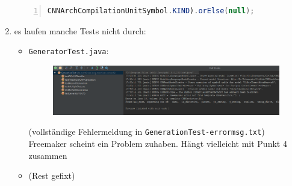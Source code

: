 \documentclass[11pt]{article}
\begin{document}
\begin{enumerate}
\begin{lstlisting}[language=java, numbers=left, basicstyle=\scriptsize]
CNNArchCompilationUnitSymbol.KIND).orElse(null);
			\end{lstlisting}
		\item es laufen manche Tests nicht durch:
			\begin{itemize}
				\item \texttt{GeneratorTest.java}:\\
					\begin{figure}[H]
						\includegraphics[scale=0.5]{CNNArchLang-generationTest.PNG}
					\end{figure}
					
					(vollständige Fehlermeldung in \texttt{GenerationTest-errormsg.txt})
					Freemaker scheint ein Problem zuhaben. Hängt vielleicht mit Punkt 4 zusammen
				\item (Rest gefixt)
			\end{itemize}
				
	\end{enumerate}	
\end{document}
